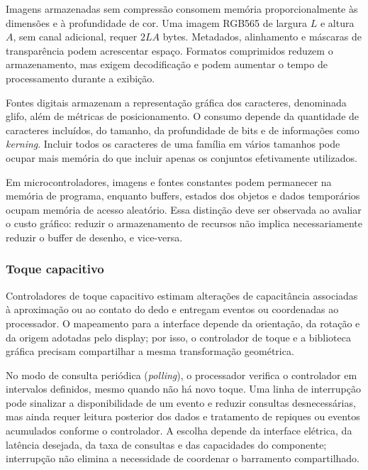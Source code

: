 \documentclass{article}
\begin{document}
Imagens armazenadas sem compress\~ao consomem mem\'oria proporcionalmente \`as dimens\~oes e \`a profundidade de cor. Uma imagem RGB565 de largura \(L\) e altura \(A\), sem canal adicional, requer \(2LA\) bytes. Metadados, alinhamento e m\'ascaras de transpar\^encia podem acrescentar espa\c{c}o. Formatos comprimidos reduzem o armazenamento, mas exigem decodifica\c{c}\~ao e podem aumentar o tempo de processamento durante a exibi\c{c}\~ao.


Fontes digitais armazenam a representa\c{c}\~ao gr\'afica dos caracteres, denominada glifo, al\'em de m\'etricas de posicionamento. O consumo depende da quantidade de caracteres inclu\'idos, do tamanho, da profundidade de bits e de informa\c{c}\~oes como \emph{kerning}. Incluir todos os caracteres de uma fam\'ilia em v\'arios tamanhos pode ocupar mais mem\'oria do que incluir apenas os conjuntos efetivamente utilizados.


Em microcontroladores, imagens e fontes constantes podem permanecer na mem\'oria de programa, enquanto buffers, estados dos objetos e dados tempor\'arios ocupam mem\'oria de acesso aleat\'orio. Essa distin\c{c}\~ao deve ser observada ao avaliar o custo gr\'afico: reduzir o armazenamento de recursos n\~ao implica necessariamente reduzir o buffer de desenho, e vice-versa.


\subsubsection{Toque capacitivo}


Controladores de toque capacitivo estimam altera\c{c}\~oes de capacit\^ancia associadas \`a aproxima\c{c}\~ao ou ao contato do dedo e entregam eventos ou coordenadas ao processador. O mapeamento para a interface depende da orienta\c{c}\~ao, da rota\c{c}\~ao e da origem adotadas pelo display; por isso, o controlador de toque e a biblioteca gr\'afica precisam compartilhar a mesma transforma\c{c}\~ao geom\'etrica.


No modo de consulta peri\'odica (\emph{polling}), o processador verifica o controlador em intervalos definidos, mesmo quando n\~ao h\'a novo toque. Uma linha de interrup\c{c}\~ao pode sinalizar a disponibilidade de um evento e reduzir consultas desnecess\'arias, mas ainda requer leitura posterior dos dados e tratamento de repiques ou eventos acumulados conforme o controlador. A escolha depende da interface el\'etrica, da lat\^encia desejada, da taxa de consultas e das capacidades do componente; interrup\c{c}\~ao n\~ao elimina a necessidade de coordenar o barramento compartilhado.
\end{document}
